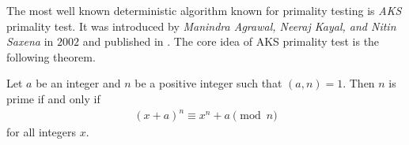 \documentclass{subfiles}
\begin{document}
	The most well known deterministic algorithm known for primality testing is \textit{AKS} primality test. It was introduced by \textit{Manindra Agrawal, Neeraj Kayal, and Nitin Saxena} in $2002$ and published in \textcite{agrawal_kayal_saxena_2004}. The core idea of AKS primality test is the following theorem.
		\begin{theorem}
			Let $a$ be an integer and $n$ be a positive integer such that $(a,n)=1$. Then $n$ is prime if and only if
				\begin{align*}
					(x+a)^n \equiv x^n + a \pmod n
				\end{align*}
			for all integers $x$.
		\end{theorem}
\end{document}
